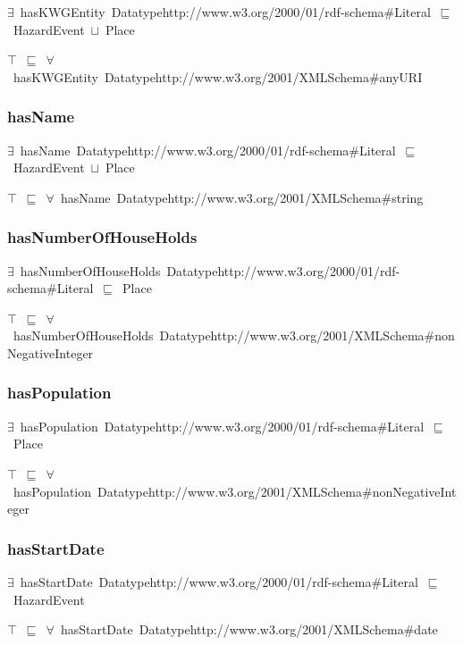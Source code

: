 \documentclass{article}
\begin{document}
\ensuremath{\exists}~hasKWGEntity~Datatypehttp://www.w3.org/2000/01/rdf-schema#Literal~\ensuremath{\sqsubseteq}~HazardEvent~\ensuremath{\sqcup}~Place

\ensuremath{\top}~\ensuremath{\sqsubseteq}~\ensuremath{\forall}~hasKWGEntity~Datatypehttp://www.w3.org/2001/XMLSchema#anyURI

\subsubsection*{hasName}

\ensuremath{\exists}~hasName~Datatypehttp://www.w3.org/2000/01/rdf-schema#Literal~\ensuremath{\sqsubseteq}~HazardEvent~\ensuremath{\sqcup}~Place

\ensuremath{\top}~\ensuremath{\sqsubseteq}~\ensuremath{\forall}~hasName~Datatypehttp://www.w3.org/2001/XMLSchema#string

\subsubsection*{hasNumberOfHouseHolds}

\ensuremath{\exists}~hasNumberOfHouseHolds~Datatypehttp://www.w3.org/2000/01/rdf-schema#Literal~\ensuremath{\sqsubseteq}~Place

\ensuremath{\top}~\ensuremath{\sqsubseteq}~\ensuremath{\forall}~hasNumberOfHouseHolds~Datatypehttp://www.w3.org/2001/XMLSchema#nonNegativeInteger

\subsubsection*{hasPopulation}

\ensuremath{\exists}~hasPopulation~Datatypehttp://www.w3.org/2000/01/rdf-schema#Literal~\ensuremath{\sqsubseteq}~Place

\ensuremath{\top}~\ensuremath{\sqsubseteq}~\ensuremath{\forall}~hasPopulation~Datatypehttp://www.w3.org/2001/XMLSchema#nonNegativeInteger

\subsubsection*{hasStartDate}

\ensuremath{\exists}~hasStartDate~Datatypehttp://www.w3.org/2000/01/rdf-schema#Literal~\ensuremath{\sqsubseteq}~HazardEvent

\ensuremath{\top}~\ensuremath{\sqsubseteq}~\ensuremath{\forall}~hasStartDate~Datatypehttp://www.w3.org/2001/XMLSchema#date
\end{document}
